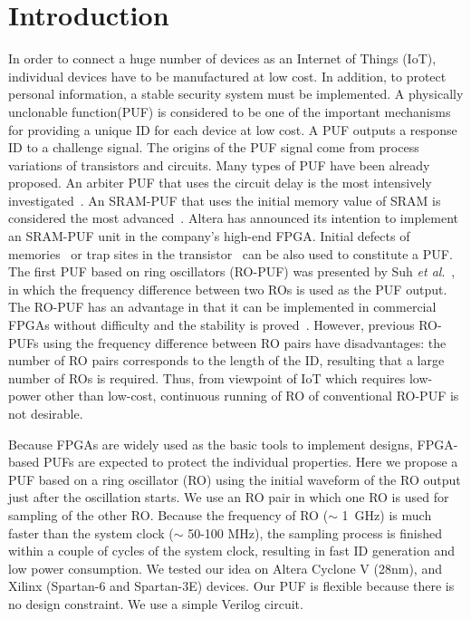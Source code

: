 ﻿\documentclass[aps,preprint,prb,superscriptaddress,amsmath,showpacs,tightenlines]{revtex4}
\begin{document}
\section{Introduction}
In order to connect a huge number 
of devices as an Internet of Things (IoT), individual 
devices have to be manufactured at low cost.
In addition, to protect personal information, 
a stable security system must be implemented.
A physically unclonable function(PUF) is considered to be 
one of the important mechanisms for 
providing a unique ID for each device at low cost.
A PUF outputs a response ID  to a challenge signal.
The origins of the PUF signal  come from  process variations of transistors
and circuits.
Many types of PUF have been already proposed.
An arbiter PUF that uses the circuit delay is the most 
intensively investigated~\cite{arbiter,Lee}.
An SRAM-PUF that uses the initial memory value 
of SRAM is considered the most advanced~\cite{Guajardo,Holcomb}. 
Altera has announced its intention to implement an SRAM-PUF unit 
in the company's high-end FPGA.
Initial defects of memories~\cite{Marukame,RRAM} or 
trap sites in the transistor~\cite{Chen} can be also used to constitute a PUF. 
The first PUF based on ring oscillators (RO-PUF)  
was presented by Suh {\it et al}.~\cite{Suh},
in which the frequency difference between two ROs
is used as the PUF output.
The RO-PUF has an advantage in that it can be implemented 
in commercial FPGAs without difficulty and the stability is 
proved~\cite{Maiti0}.
However, previous RO-PUFs using the frequency difference 
between RO pairs have disadvantages: 
the number of RO pairs corresponds to 
the length of the ID, resulting that a large number of ROs is required. 
Thus, from viewpoint of IoT which requires low-power other than low-cost,
continuous running of RO of conventional RO-PUF is not desirable.


Because  FPGAs are widely used as the basic tools
to implement designs, FPGA-based PUFs are expected to 
protect the individual properties.
Here we propose a PUF based on a ring oscillator (RO) using 
the initial waveform of the RO output just after the oscillation starts.
We use an RO pair in which one RO is used for sampling of the other RO.
Because the frequency of RO ($\sim$ 1~GHz) is much faster than the system clock
($\sim$ 50-100 MHz), the sampling process is finished within a couple of 
cycles of the system clock, resulting in fast ID generation and 
low power consumption.
We tested our idea on Altera Cyclone V (28nm), and Xilinx (Spartan-6 and Spartan-3E) devices.
Our PUF is flexible because there is no design constraint. 
We use a simple Verilog circuit.
\end{document}
